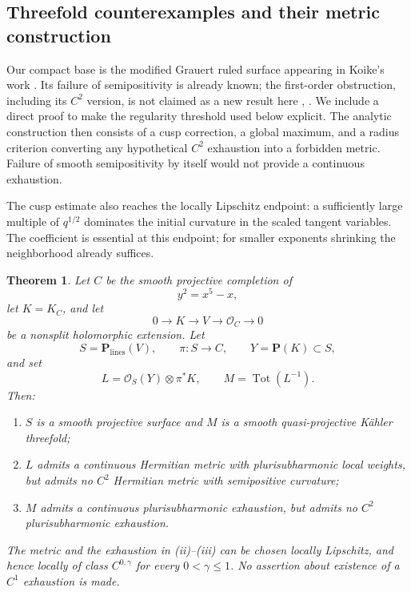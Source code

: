 \documentclass[11pt]{amsart}
\newtheorem{theorem}{Theorem}[section]
\theoremstyle{definition}
\theoremstyle{remark}
\numberwithin{equation}{section}
\newcommand{\PP}{\mathbf P}
\newcommand{\OO}{\mathcal O}
\newcommand{\Tot}{\operatorname{Tot}}
\begin{document}
\subsection{Threefold counterexamples and their metric construction}

Our compact base is the modified Grauert ruled surface appearing in
Koike's work \cite[Example~4.1]{Koike2021}. Its failure of semipositivity
is already known; the first-order obstruction, including its $C^2$
version, is not claimed as a new result here
\cite[Theorem~1.4 and Example~4.1]{Koike2021},
\cite[Remark~2.8]{Wu2026}. We include a direct proof to make the
regularity threshold used below explicit. The analytic construction
then consists of a cusp correction, a global maximum, and a radius
criterion converting any hypothetical $C^2$ exhaustion into a
forbidden metric. Failure of smooth semipositivity by itself would
not provide a continuous exhaustion.

The cusp estimate also reaches the locally Lipschitz endpoint: a
sufficiently large multiple of $q^{1/2}$ dominates the initial
curvature in the scaled tangent variables. The coefficient is
essential at this endpoint; for smaller exponents shrinking the
neighborhood already suffices.

\begin{theorem}\label{thm:main}
Let $C$ be the smooth projective completion of
\[
 y^2=x^5-x,
\]
let $K=K_C$, and let
\begin{equation}\label{eq:extension-intro}
 0\longrightarrow K\longrightarrow V\longrightarrow\OO_C
 \longrightarrow0
\end{equation}
be a nonsplit holomorphic extension. Let
\[
 S=\PP_{\mathrm{lines}}(V),\qquad
 \pi:S\longrightarrow C,\qquad
 Y=\PP(K)\subset S,
\]
and set
\begin{equation}\label{eq:main-line}
 L=\OO_S(Y)\otimes\pi^*K,\qquad M=\Tot(L^{-1}).
\end{equation}
Then:
\begin{enumerate}[label=\textup{(\roman*)},leftmargin=2.5em]
 \item $S$ is a smooth projective surface and $M$ is a smooth
 quasi-projective K\"ahler threefold;
 \item $L$ admits a continuous Hermitian metric with plurisubharmonic
 local weights, but admits no $C^2$ Hermitian metric with semipositive
 curvature;
 \item $M$ admits a continuous plurisubharmonic exhaustion, but admits
 no $C^2$ plurisubharmonic exhaustion.
\end{enumerate}
The metric and the exhaustion in \textup{(ii)--(iii)} can be chosen
locally Lipschitz, and hence locally of class $C^{0,\gamma}$ for every
$0<\gamma\le1$. No assertion about existence of a $C^1$ exhaustion
is made.
\end{theorem}
\end{document}

